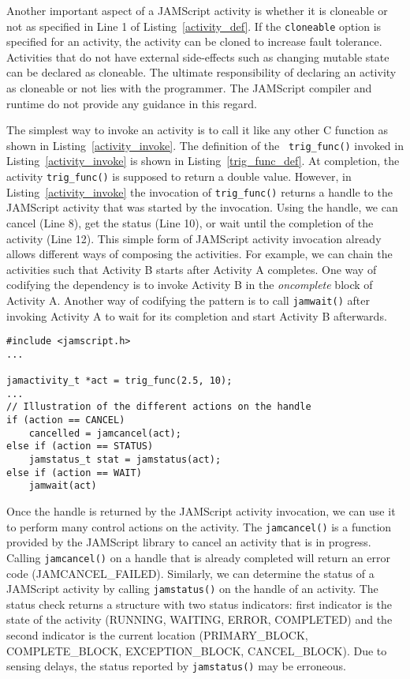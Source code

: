 \documentclass[11pt]{article}
\begin{document}
Another important aspect of a JAMScript activity is whether it is cloneable or
not as specified in Line 1 of Listing~\ref{activity_def}. If the {\tt cloneable}
option is specified for an activity, the activity can be cloned to increase
fault tolerance. Activities that do not have external side-effects such as
changing mutable state can be declared as cloneable. The ultimate responsibility
of declaring an activity as cloneable or not lies with the programmer. The
JAMScript compiler and runtime do not provide any guidance in this regard.

The simplest way to invoke an activity is to call it like any other C function
as shown in Listing~\ref{activity_invoke}. The definition of the {\tt
trig\_func()} invoked in Listing~\ref{activity_invoke} is shown in
Listing~\ref{trig_func_def}. At completion, the activity {\tt trig\_func()} is
supposed to return a double value. However, in Listing~\ref{activity_invoke} the
invocation of {\tt trig\_func()} returns a handle to the JAMScript activity that
was started by the invocation. Using the handle, we can cancel (Line 8), get the
status (Line 10), or wait until the completion of the activity (Line 12). This
simple form of JAMScript activity invocation already allows different ways of
composing the activities. For example, we can chain the activities such that
Activity B starts after Activity A completes. One way of codifying the
dependency is to invoke Activity B in the {\em oncomplete} block of Activity A.
Another way of codifying the pattern is to call {\tt jamwait()} after invoking
Activity A to wait for its completion and start Activity B afterwards.


\begin{lstlisting}[caption=Simple invocation of a JAMScript activity, label=activity_invoke]
#include <jamscript.h>
...

jamactivity_t *act = trig_func(2.5, 10);
...
// Illustration of the different actions on the handle
if (action == CANCEL)
    cancelled = jamcancel(act);
else if (action == STATUS)
    jamstatus_t stat = jamstatus(act);
else if (action == WAIT)
    jamwait(act)
\end{lstlisting}


Once the handle is returned by the JAMScript activity invocation, we can use it
to perform many control actions on the activity. The {\tt jamcancel()} is a
function provided by the JAMScript library to cancel an activity that is in
progress. Calling {\tt jamcancel()} on a handle that is already completed will
return an error code (JAMCANCEL\_FAILED).  Similarly, we can determine the status
of a JAMScript activity by calling {\tt jamstatus()} on the handle of an
activity.  The status check returns a structure with two status indicators:
first  indicator is the state of the activity (RUNNING, WAITING, ERROR,
COMPLETED) and the second indicator is the current location (PRIMARY\_BLOCK,
COMPLETE\_BLOCK, EXCEPTION\_BLOCK, CANCEL\_BLOCK). Due to sensing delays, the
status reported by {\tt jamstatus()} may be erroneous.
\end{document}
